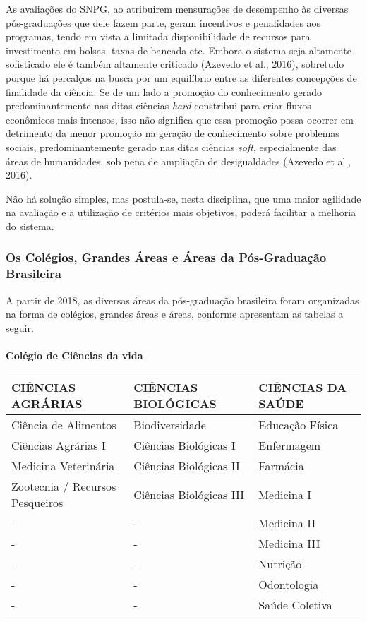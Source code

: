 \documentclass[]{article}
\let\oldparagraph\paragraph
\renewcommand{\paragraph}[1]{\oldparagraph{#1}\mbox{}}
\begin{document}
As avaliações do SNPG, ao atribuirem mensurações de desempenho às
diversas pós-graduações que dele fazem parte, geram incentivos e
penalidades aos programas, tendo em vista a limitada disponibilidade de
recursos para investimento em bolsas, taxas de bancada etc. Embora o
sistema seja altamente sofisticado ele é também altamente criticado
(Azevedo et al., 2016), sobretudo porque há percalços na busca por um
equilíbrio entre as diferentes concepções de finalidade da ciência. Se
de um lado a promoção do conhecimento gerado predominantemente nas ditas
ciências \emph{hard} constribui para criar fluxos econômicos mais
intensos, isso não significa que essa promoção possa ocorrer em
detrimento da menor promoção na geração de conhecimento sobre problemas
sociais, predominantemente gerado nas ditas ciências \emph{soft},
especialmente das áreas de humanidades, sob pena de ampliação de
desigualdades (Azevedo et al., 2016).

Não há solução simples, mas postula-se, nesta disciplina, que uma maior
agilidade na avaliação e a utilização de critérios mais objetivos,
poderá facilitar a melhoria do sistema.

\subsubsection{Os Colégios, Grandes Áreas e Áreas da Pós-Graduação
Brasileira}\label{os-colegios-grandes-areas-e-areas-da-pos-graduacao-brasileira}

A partir de 2018, as diversas áreas da pós-graduação brasileira foram
organizadas na forma de colégios, grandes áreas e áreas, conforme
apresentam as tabelas a seguir.

\paragraph{Colégio de Ciências da
vida}\label{colegio-de-ciencias-da-vida}

\begin{longtable}[]{@{}lll@{}}
\toprule
CIÊNCIAS AGRÁRIAS & CIÊNCIAS BIOLÓGICAS & CIÊNCIAS DA
SAÚDE\tabularnewline
\midrule
\endhead
Ciência de Alimentos & Biodiversidade & Educação Física\tabularnewline
Ciências Agrárias I & Ciências Biológicas I & Enfermagem\tabularnewline
Medicina Veterinária & Ciências Biológicas II & Farmácia\tabularnewline
Zootecnia / Recursos Pesqueiros & Ciências Biológicas III & Medicina
I\tabularnewline
- & - & Medicina II\tabularnewline
- & - & Medicina III\tabularnewline
- & - & Nutrição\tabularnewline
- & - & Odontologia\tabularnewline
- & - & Saúde Coletiva\tabularnewline
\bottomrule
\end{longtable}
\end{document}
